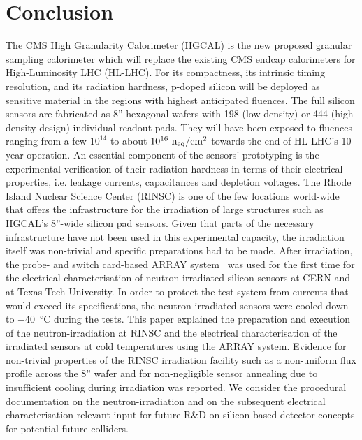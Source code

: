 \section{Conclusion}
\label{sec:conclusion}
The CMS High Granularity Calorimeter (HGCAL) is the new proposed granular sampling calorimeter which will replace the existing CMS endcap calorimeters for High-Luminosity LHC (HL-LHC).
For its compactness, its intrinsic timing resolution, and its radiation hardness, p-doped silicon will be deployed as sensitive material in the regions with highest anticipated fluences.
The full silicon sensors are fabricated as 8'' hexagonal wafers with 198 (low density) or 444 (high density design) individual readout pads.
They will have been exposed to fluences ranging from  a few $10^{14}$ to about $10^{16}~\mathrm{n_{eq}}/\mathrm{cm}^{2}$ towards the end of HL-LHC's 10-year operation.\newline
An essential component of the sensors' prototyping is the experimental verification of their radiation hardness in terms of their electrical properties, i.e. leakage currents, capacitances and depletion voltages.
The Rhode Island Nuclear Science Center (RINSC) is one of the few locations world-wide that offers the infrastructure for the irradiation of large structures such as HGCAL's 8''-wide silicon pad sensors.
Given that parts of the necessary infrastructure have not been used in this experimental capacity, the irradiation itself was non-trivial and specific preparations had to be made.
After irradiation, the probe- and switch card-based ARRAY system~\cite{pitters:array2019} was used for the first time for the electrical characterisation of neutron-irradiated silicon sensors at CERN and at Texas Tech University.
In order to protect the test system from currents that would exceed its specifications, the neutron-irradiated sensors were cooled down to \SI{-40}{\celsius} during the tests.\newline
This paper explained the preparation and execution of the neutron-irradiation at RINSC and the electrical characterisation of the irradiated sensors at cold temperatures using the ARRAY system.
Evidence for non-trivial properties of the RINSC irradiation facility such as a non-uniform flux profile across the 8'' wafer and for non-negligible sensor annealing due to insufficient cooling during irradiation was reported.
We consider the procedural documentation on the neutron-irradiation and on the subsequent electrical characterisation relevant input for future R$\&$D on silicon-based detector concepts for potential future colliders.\newline

